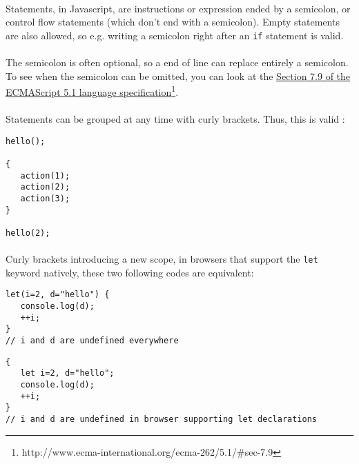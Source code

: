 \documentclass{article}
\begin{document}
\begin{sloppypar}
\paragraph{}
Statements, in Javascript, are instructions or expression ended by a semicolon, or control flow statements (which don't end with a semicolon). Empty statements are also allowed, so e.g. writing a semicolon right after an \lstinline!if! statement is valid.
   
   
\paragraph{}
The semicolon is often optional, so a end of line can replace entirely a semicolon. To see when the semicolon can be omitted, you can look at the \href{http://www.ecma-international.org/ecma-262/5.1/#sec-7.9}{Section 7.9 of the ECMAScript 5.1 language specification}\footnote{http://www.ecma-international.org/ecma-262/5.1/\#sec-7.9}.

   
\paragraph{}
Statements can be grouped at any time with curly brackets. Thus, this is valid :
{\begin{lstlisting}
hello();

{
   action(1);
   action(2);
   action(3);
}

hello(2);
\end{lstlisting}
}


   
\paragraph{}
Curly brackets introducing a new scope, in browsers that support the \lstinline!let! keyword natively, these two following codes are equivalent:

{\begin{lstlisting}
let(i=2, d="hello") {
   console.log(d);
   ++i;
}
// i and d are undefined everywhere
\end{lstlisting}
}


{\begin{lstlisting}
{
   let i=2, d="hello";
   console.log(d);
   ++i;
}
// i and d are undefined in browser supporting let declarations
\end{lstlisting}
}



\end{sloppypar}
\end{document}
